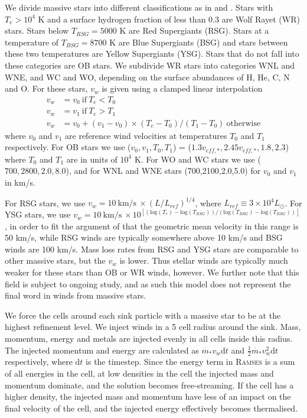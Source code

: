 \documentclass[a4paper,fleqn,usenatbib]{mnras}
\begin{document}
We divide massive stars into different classifications as in \citet{Crowther2007} and \citet{Georgy2012}. Stars with $T_e > 10^4$ K and a surface hydrogen fraction of less than 0.3 are Wolf Rayet (WR) stars. Stars below $T_{RSG} = 5000$ K are Red Supergiants (RSG). Stars at a temperature of $T_{BSG} = 8700$ K are Blue Supergiants (BSG) and stars between these two temperatures are Yellow Supergiants (YSG). Stars that do not fall into these categories are OB stars. We subdivide WR stars into categories WNL and WNE, and WC and WO, depending on the surface abundances of H, He, C, N and O. For these stars, $v_w$ is given using a clamped linear interpolation
\begin{equation}
\begin{aligned}
v_w &= v_0 \mathrm{~if~} T_e < T_0 \\
v_w &= v_1 \mathrm{~if~} T_e > T_1 \\
v_w &= v_0 + (v_1 - v_0) \times (T_e - T_0) / (T_1 - T_0) \mathrm{~otherwise}
\label{kwind}
\end{aligned}
\end{equation}
where $v_0$ and $v_1$ are reference wind velocities at temperatures $T_0$ and $T_1$ respectively. For OB stars we use ($v_0,v_1,T_0,T_1$) = ($1.3 v_{eff,*},2.45 v_{eff,*},1.8,2.3$) where $T_0$ and $T_1$ are in units of $10^4$ K. For WO and WC stars we use ($700,2800,2.0,8.0$), and for WNL and WNE stars (700,2100,2.0,5.0) for $v_0$ and $v_1$ in km/s.

For RSG stars, we use $v_w = 10 \mathrm{~km/s~} \times (L/L_{ref})^{1/4}$, where $L_{ref} \equiv 3 \times 10^4 L_{\odot}$. For YSG stars, we use  $v_w = 10 \mathrm{~km/s~} \times 10^{[(\mathrm{log}(T_e) - \mathrm{log}(T_{RSG}))/(\mathrm{log}(T_{BSG}) - \mathrm{log}(T_{RSG}))]}$, in order to fit the argument of \citet{Gatto2017} that the geometric mean velocity in this range is 50 km/s, while RSG winds are typically somewhere above 10 km/s and BSG winds are 100 km/s. Mass loss rates from RSG and YSG stars are comparable to other massive stars, but the $v_w$ is lower. Thus stellar winds are typically much weaker for these stars than OB or WR winds, however. We further note that this field is subject to ongoing study, and as such this model does not represent the final word in winds from massive stars.

We force the cells around each sink particle with a massive star to be at the highest refinement level. We inject winds in a 5 cell radius around the sink. Mass, momentum, energy and metals are injected evenly in all cells inside this radius. The injected momentum and energy are calculated as $\dot{m_*} v_w \mathrm{d}t$ and $\frac{1}{2} \dot{m_*} v_w^2 \mathrm{d}t$ respectively, where $\mathrm{d}t$ is the timestep. Since the energy term in \textsc{Ramses} is a sum of all energies in the cell, at low densities in the cell the injected mass and momentum dominate, and the solution becomes free-streaming. If the cell has a higher density, the injected mass and momentum have less of an impact on the final velocity of the cell, and the injected energy effectively becomes thermalised.
\end{document}
